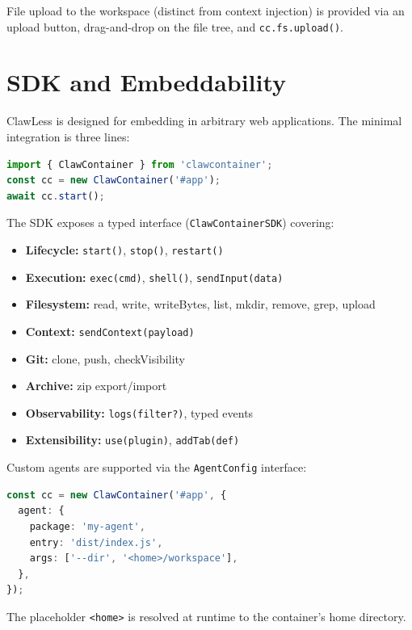 \documentclass[11pt,twocolumn]{article}
\begin{document}
File upload to the workspace (distinct from context injection) is provided via an upload button, drag-and-drop on the file tree, and \texttt{cc.fs.upload()}.

\section{SDK and Embeddability}
\label{sec:sdk}

ClawLess is designed for embedding in arbitrary web applications. The minimal integration is three lines:

\begin{lstlisting}[language=TypeScript]
import { ClawContainer } from 'clawcontainer';
const cc = new ClawContainer('#app');
await cc.start();
\end{lstlisting}

The SDK exposes a typed interface (\texttt{ClawContainerSDK}) covering:

\begin{itemize}[noitemsep]
  \item \textbf{Lifecycle:} \texttt{start()}, \texttt{stop()}, \texttt{restart()}
  \item \textbf{Execution:} \texttt{exec(cmd)}, \texttt{shell()}, \texttt{sendInput(data)}
  \item \textbf{Filesystem:} read, write, writeBytes, list, mkdir, remove, grep, upload
  \item \textbf{Context:} \texttt{sendContext(payload)}
  \item \textbf{Git:} clone, push, checkVisibility
  \item \textbf{Archive:} zip export/import
  \item \textbf{Observability:} \texttt{logs(filter?)}, typed events
  \item \textbf{Extensibility:} \texttt{use(plugin)}, \texttt{addTab(def)}
\end{itemize}

Custom agents are supported via the \texttt{AgentConfig} interface:

\begin{lstlisting}[language=TypeScript]
const cc = new ClawContainer('#app', {
  agent: {
    package: 'my-agent',
    entry: 'dist/index.js',
    args: ['--dir', '<home>/workspace'],
  },
});
\end{lstlisting}

The placeholder \texttt{<home>} is resolved at runtime to the container's home directory.
\end{document}
